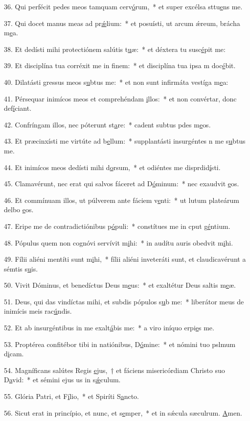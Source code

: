 36. Qui perfécit pedes meos tamquam cerv\uline{ó}rum,~* et super excélsa sttu\uline{e}ns me.\par 
37. Qui docet manus meas ad pr\uline{ǽ}lium:~* et posuísti, ut arcum ǽreum, brácha m\uline{e}a.\par 
38. Et dedísti mihi protectiónem salútis t\uline{u}æ:~* et déxtera tu susc\uline{é}pit me:\par 
39. Et disciplína tua corréxit me in f\uline{i}nem:~* et disciplína tua ipsa m doc\uline{é}bit.\par 
40. Dilatásti gressus meos s\uline{u}btus me:~* et non sunt infirmáta vestíga m\uline{e}a:\par 
41. Pérsequar inimícos meos et comprehéndam \uline{i}llos:~* et non convértar, donc def\uline{í}ciant.\par 
42. Confríngam illos, nec póterunt st\uline{a}re:~* cadent subtus pdes m\uline{e}os.\par 
43. Et præcinxísti me virtúte ad b\uline{e}llum:~* supplantásti insurgéntes n me s\uline{u}btus me.\par 
44. Et inimícos meos dedísti mihi d\uline{o}rsum,~* et odiéntes me disprdid\uline{í}sti.\par 
45. Clamavérunt, nec erat qui salvos fáceret ad D\uline{ó}minum:~* nec exaudvit \uline{e}os.\par 
46. Et commínuam illos, ut púlverem ante fáciem v\uline{e}nti:~* ut lutum plateárum delbo \uline{e}os.\par 
47. Eripe me de contradictiónibus p\uline{ó}puli:~* constítues me in cput g\uline{é}ntium.\par 
48. Pópulus quem non cognóvi servívit m\uline{i}hi:~* in audítu auris obedvit m\uline{i}hi.\par 
49. Fílii aliéni mentíti sunt m\uline{i}hi,~* fílii aliéni inveteráti sunt, et claudicavérunt a sémtis s\uline{u}is.\par 
50. Vivit Dóminus, et benedíctus Deus m\uline{e}us:~* et exaltétur Deus saltis m\uline{e}æ.\par 
51. Deus, qui das vindíctas mihi, et subdis pópulos s\uline{u}b me:~* liberátor meus de inimícis meis rac\uline{ú}ndis.\par 
52. Et ab insurgéntibus in me exalt\uline{á}bis me:~* a viro iníquo erpi\uline{e}s me.\par 
53. Proptérea confitébor tibi in natiónibus, D\uline{ó}mine:~* et nómini tuo pslmum d\uline{i}cam.\par 
54. Magníficans salútes Regis \uline{e}jus,~† et fáciens misericórdiam Christo suo D\uline{a}vid:~* et sémini ejus us in s\uline{ǽ}culum.\par 
55. Glória Patri, et F\uline{í}lio,~* et Spiríti S\uline{a}ncto.\par 
56. Sicut erat in princípio, et nunc, et s\uline{e}mper,~* et in sǽcula sæculrum. \uline{A}men.\par 
